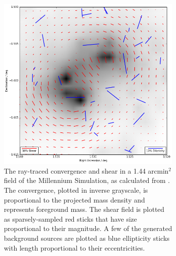 \documentclass[%
 reprint,
 amsmath,amssymb,
 aps,nofootinbib
]{revtex4-1}
\begin{document}
\begin{figure}
    \centering
    \begin{subfigure}[H]{0.45\textwidth}
        \includegraphics[width=\textwidth]{figs-swe/thesis/field2.png}
        \captionsetup{justification=raggedright,singlelinecheck=false}
        \caption{The ray-traced convergence and shear in a 1.44 arcmin$^2$ field of the Millennium Simulation, as calculated from \cite{ray_tracing}. The convergence, plotted in inverse grayscale, is proportional to the projected mass density and represents foreground mass. The shear field is plotted as sparsely-sampled red sticks that have size proportional to their magnitude. A few of the generated background sources are plotted as blue ellipticity sticks with length proportional to their eccentricities.}
        \label{fig:field2}
    \end{subfigure}
     ~
    \begin{subfigure}[H]{0.45\textwidth}

\end{subfigure}
\end{figure}
\end{document}
